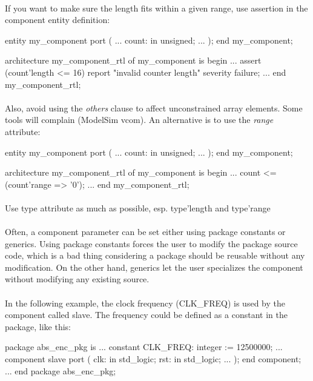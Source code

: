 \documentclass[12pt]{article}
\begin{document}
\paragraph{}
If you want to make sure the length fits within a given range,
use assertion in the component entity definition:
\begin{vhdl}
entity my_component
port
(
 ...
 count: in unsigned;
 ...
);
end my_component;

architecture my_component_rtl of my_component is
begin
...
assert (count'length <= 16)
report "invalid counter length"
severity failure;
...
end my_component_rtl;
\end{vhdl}

\paragraph{}
Also, avoid using the \textit{others} clause to affect unconstrained
array elements. Some tools will complain (ModelSim vcom). An alternative
is to use the \textit{range} attribute:
\begin{vhdl}
entity my_component
port
(
 ...
 count: in unsigned;
 ...
);
end my_component;

architecture my_component_rtl of my_component is
begin
...
count <= (count'range => '0');
...
end my_component_rtl;
\end{vhdl}


\paragraph{}
Use type attribute as much as possible, esp. type'length
and type'range


\paragraph{}
Often, a component parameter can be set either using package constants
or generics. Using package constants forces the user to modify the package
source code, which is a bad thing considering a package should be reusable
without any modification. On the other hand, generics let the user specializes
the component without modifying any existing source.

\paragraph{}
In the following example, the clock frequency (CLK\_FREQ) is used by the
component called slave. The frequency could be defined as a constant in the
package, like this:
\begin{vhdl}
package abs_enc_pkg is
...
constant CLK_FREQ: integer := 12500000;
...
component slave
port
(
 clk: in std_logic;
 rst: in std_logic;
 ...
);
end component;
...
end package abs_enc_pkg;
\end{vhdl}
\end{document}
